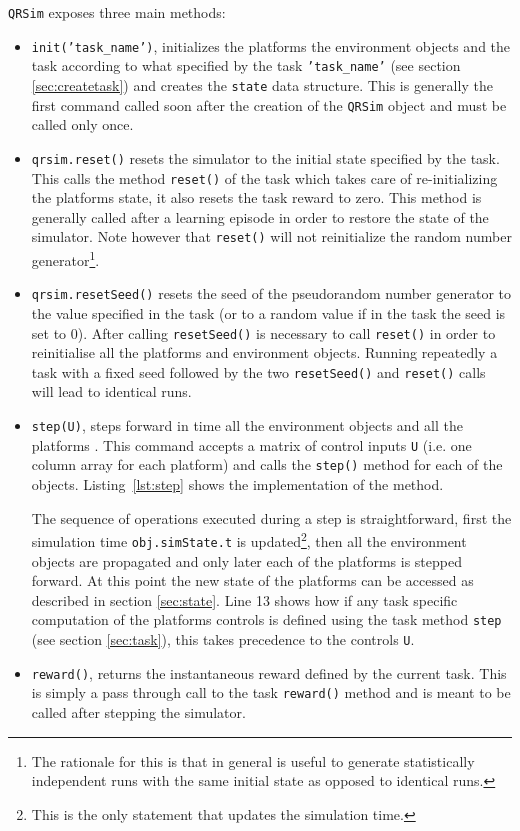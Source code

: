 \documentclass[a4paper,11pt]{report}
\newcommand{\snamettt}{\texttt{QRSim}\xspace}
\begin{document}
\snamettt exposes three main methods:
\begin{itemize}
 \item \texttt{init('task\_name')}, initializes the platforms the environment objects and the task according to what specified by the task \texttt{'task\_name'} (see section \ref{sec:createtask}) and creates the \texttt{state} data structure. This is generally the first command called soon after the creation of the \snamettt object and must be called only once.
\item \texttt{qrsim.reset()} resets the simulator to the initial state specified by the task. This calls the method \texttt{reset()} of the task which takes care of re-initializing the platforms state, it also resets the task reward to zero. This method is generally called after a learning episode in order to restore the state of the simulator. Note however that \texttt{reset()} will not reinitialize the random number generator\footnote{The rationale for this is that in general is useful to generate statistically independent runs with the same initial state as opposed to identical runs.}.
\item \texttt{qrsim.resetSeed()} resets the seed of the pseudorandom number generator to the value specified in the task (or to a random value if in the task the seed is set to $0$). After calling \texttt{resetSeed()} is necessary to call \texttt{reset()} in order to reinitialise all the platforms and environment objects. Running repeatedly a task with a fixed seed followed by the two \texttt{resetSeed()} and \texttt{reset()} calls will lead to identical runs.   
 \item \texttt{step(U)}, steps forward in time all the environment objects and all the platforms . This command accepts a matrix of control inputs \texttt{U} (i.e. one column array for each platform) and calls the \texttt{step()} method for each of the objects. Listing~\ref{lst:step} shows the implementation of the method.

The sequence of operations executed during a step is straightforward, first the simulation time \texttt{obj.simState.t} is updated\footnote{This is the only statement that updates the simulation time.}, then all the environment objects are propagated and only later each of the platforms is stepped forward. At this point the new state of the platforms can be accessed as described in section \ref{sec:state}. Line 13 shows how if any task specific computation of the platforms controls is defined using the task method \texttt{step} (see section \ref{sec:task}), this takes precedence to the controls \texttt{U}.
 \item \texttt{reward()}, returns the instantaneous reward defined by the current task. This is simply a pass through call to the task \texttt{reward()} method and is meant to be called after stepping the simulator.
\end{itemize}
\end{document}
